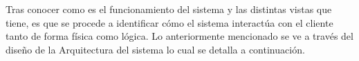 Tras conocer como es el funcionamiento del sistema y las distintas vistas que tiene, es que se procede a identificar cómo el sistema interactúa con el cliente tanto de forma física como lógica. Lo anteriormente mencionado se ve a través del diseño de la Arquitectura del sistema lo cual se detalla a continuación.